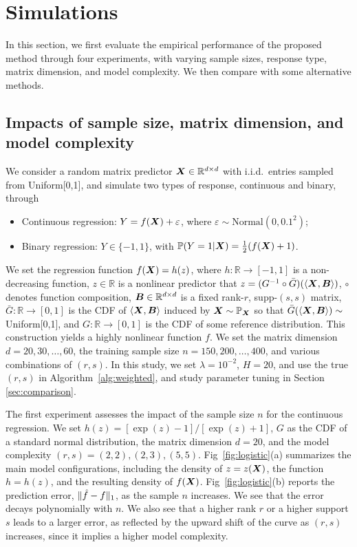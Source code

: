\documentclass[aos]{imsart}
\theoremstyle{definition}
\begin{document}
\section{Simulations}
\label{sec:simulation}

In this section, we first evaluate the empirical performance of the proposed method through four experiments, with varying sample sizes, response type, matrix dimension, and model complexity. We then compare with some alternative methods. 

\subsection{Impacts of sample size, matrix dimension, and model complexity}
\label{sec:validation}

We consider a random matrix predictor $\bm X\in\mathbb{R}^{d\times d}$ with i.i.d.\ entries sampled from Uniform[0,1], and simulate two types of response, continuous and binary, through 
\begin{itemize}
\item Continuous regression: $Y=f(\bm X)+\varepsilon$, where $\varepsilon \sim \text{Normal}(0,0.1^2)$;
\item Binary regression: $Y\in\{-1,1\}$, with $\mathbb{P}(Y=1|\bm X)={1\over 2}(f(\bm X)+1)$.
\end{itemize}
We set the regression function $f(\bm X)=h(z)$, where $h\colon \mathbb{R}\to[-1,1]$ is a non-decreasing function, $z\in\mathbb{R}$ is a nonlinear predictor that $z= (G^{-1}\circ \bar G)(\langle \bm X, \bm B \rangle)$, $\circ$ denotes function composition, $\bm B\in\mathbb{R}^{d\times d}$ is a fixed rank-$r$, supp-$(s,s)$ matrix, $\bar G\colon \mathbb{R}\to[0,1]$ is the CDF of $\langle \bm X, \bm B \rangle$ induced by $\bm X\sim \mathbb{P}_{\bm X}$ so that $\bar G(\langle \bm X, \bm B \rangle)\sim$ Uniform[0,1], and $G\colon \mathbb{R}\to[0,1]$ is the CDF of some reference distribution. This construction yields a highly nonlinear function $f$. We set the matrix dimension $d=20,30,\ldots,60$, the training sample size $n=150, 200, \ldots, 400$, and various combinations of $(r,s)$. In this study, we set $\lambda=10^{-2}$, $H=20$, and use the true $(r,s)$ in Algorithm~\ref{alg:weighted}, and study parameter tuning in Section \ref{sec:comparison}. 

The first experiment assesses the impact of the sample size $n$ for the continuous regression. We set $h(z)=[\exp(z)-1] / [\exp(z)+1]$, $G$ as the CDF of a standard normal distribution, the matrix dimension $d=20$, and the model complexity $(r,s)=(2,2),(2,3),(5,5)$. Fig~\ref{fig:logistic}(a) summarizes the main model configurations, including the density of $z=z(\bm X)$, the function $h=h(z)$, and the resulting density of $f(\bm X)$. Fig~\ref{fig:logistic}(b) reports the prediction error, $\lVert\hat f - f\rVert_1$, as the sample $n$ increases. We see that the error decays polynomially with $n$. We also see that a higher rank $r$ or a higher support $s$ leads to a larger error, as reflected by the upward shift of the curve as $(r,s)$ increases, since it implies a higher model  complexity.  
\end{document}

